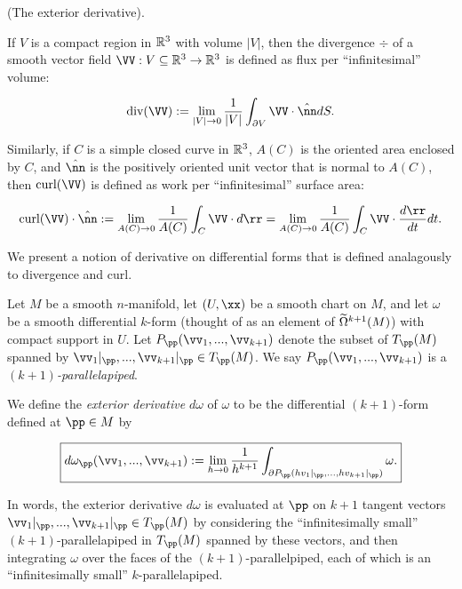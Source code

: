 \begin{defn}
\label{ch::diff_forms::defn::exterior_derivative}
     (The exterior derivative). 
    
    If $V$ is a compact region in $\mathbb{R}^3$ with volume $|V|$, then the divergence $\div$ of a smooth vector field $\VV:V \subseteq \R^3 \rightarrow \R^3$ is defined as flux per ``infinitesimal'' volume:
    
    \begin{align*}
        \div(\VV) :=  \lim_{|V| \rightarrow 0} \frac{1}{|V|} \int_{\pd V} \VV \cdot \hat{\nn} dS.
    \end{align*}
    
    Similarly, if $C$ is a simple closed curve in $\mathbb{R}^3$, $A(C)$ is the oriented area enclosed by $C$, and $\hat{\nn}$ is the positively oriented unit vector that is normal to $A(C)$, then $\curl(\VV)$ is defined as work per ``infinitesimal'' surface area:
    
    \begin{align*}
        \curl(\VV) \cdot \hat{\nn} := \lim_{A(C) \rightarrow 0} \frac{1}{A(C)} \int_C \VV \cdot d\rr = \lim_{A(C) \rightarrow 0} \frac{1}{A(C)} \int_C \VV \cdot \frac{d\rr}{dt} dt.
    \end{align*}
    
    We present a notion of derivative on differential forms that is defined analagously to divergence and curl.
    
    Let $M$ be a smooth $n$-manifold, let $(U, \xx)$ be a smooth chart on $M$, and let $\omega$ be a smooth differential $k$-form (thought of as an element of $\widetilde{\Omega}^{k + 1}(M)$) with compact support in $U$. Let $P_\pp(\vv_1, ..., \vv_{k + 1})$ denote the subset of $T_\pp(M)$ spanned by $\vv_1|_\pp, ..., \vv_{k + 1}|_\pp \in T_\pp(M)$. We say $P_\pp(\vv_1, ..., \vv_{k + 1})$ is a \textit{$(k + 1)$-parallelapiped}.
    
    We define the \textit{exterior derivative} $d\omega$ of $\omega$ to be the differential $(k + 1)$-form defined at $\pp \in M$ by
    
    \begin{align*}
        \boxed
        {
            d\omega_\pp(\vv_1, ..., \vv_{k + 1}) := \lim_{h \rightarrow 0} \frac{1}{h^{k + 1}} \int_{\pd P_\pp(h v_1|_\pp, ..., h v_{k + 1}|_\pp)} \omega.
        }
    \end{align*}
    
    In words, the exterior derivative $d \omega$ is evaluated at $\pp$ on $k + 1$ tangent vectors $\vv_1|_\pp, ..., \vv_{k + 1}|_\pp \in T_\pp(M)$ by considering the ``infinitesimally small'' $(k + 1)$-parallelapiped in $T_\pp(M)$ spanned by these vectors, and then integrating $\omega$ over the faces of the $(k + 1)$-parallelpiped, each of which is an ``infinitesimally small'' $k$-parallelapiped.
    

\end{defn}
